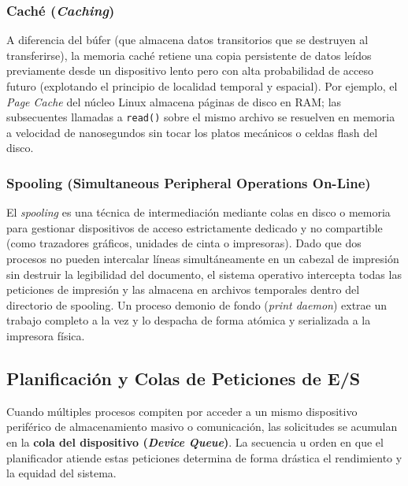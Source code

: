 \documentclass[11pt,letterpaper]{article}
\begin{document}
\subsubsection{Caché (\textit{Caching})}
A diferencia del búfer (que almacena datos transitorios que se destruyen al transferirse), la memoria caché retiene una copia persistente de datos leídos previamente desde un dispositivo lento pero con alta probabilidad de acceso futuro (explotando el principio de localidad temporal y espacial). Por ejemplo, el \textit{Page Cache} del núcleo Linux almacena páginas de disco en RAM; las subsecuentes llamadas a \texttt{read()} sobre el mismo archivo se resuelven en memoria a velocidad de nanosegundos sin tocar los platos mecánicos o celdas flash del disco.

\subsubsection{Spooling (Simultaneous Peripheral Operations On-Line)}
El \textit{spooling} es una técnica de intermediación mediante colas en disco o memoria para gestionar dispositivos de acceso estrictamente dedicado y no compartible (como trazadores gráficos, unidades de cinta o impresoras). Dado que dos procesos no pueden intercalar líneas simultáneamente en un cabezal de impresión sin destruir la legibilidad del documento, el sistema operativo intercepta todas las peticiones de impresión y las almacena en archivos temporales dentro del directorio de spooling. Un proceso demonio de fondo (\textit{print daemon}) extrae un trabajo completo a la vez y lo despacha de forma atómica y serializada a la impresora física.

\subsection{Planificación y Colas de Peticiones de E/S}

Cuando múltiples procesos compiten por acceder a un mismo dispositivo periférico de almacenamiento masivo o comunicación, las solicitudes se acumulan en la \textbf{cola del dispositivo (\textit{Device Queue})}. La secuencia u orden en que el planificador atiende estas peticiones determina de forma drástica el rendimiento y la equidad del sistema.
\end{document}
